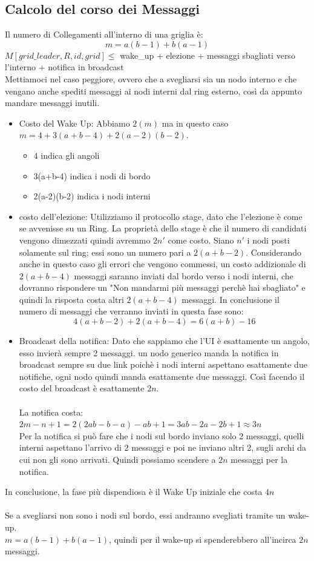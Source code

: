 \subsection{Calcolo del corso dei Messaggi}
Il numero di Collegamenti all'interno di una griglia è:
$$m=a(b-1)+b(a-1)$$
$M[grid\_leader,R,id,grid] \leq $ wake\_up + elezione + messaggi sbagliati verso l'interno + notifica in broadcast\\
Mettiamoci nel caso peggiore, ovvero che a svegliarsi sia un nodo interno e che vengano anche spediti messaggi ai nodi interni dal ring esterno, così da appunto mandare messaggi inutili.
\begin{itemize}
    \item Costo del Wake Up: Abbiamo $2(m)$ ma in questo caso $m = 4+3(a+b-4)+2(a-2)(b-2)$.
    \begin{itemize}
        \item $4$ indica gli angoli
        \item 3(a+b-4) indica i nodi di bordo
        \item 2(a-2)(b-2) indica i nodi interni
    \end{itemize}
    \item costo dell'elezione: Utilizziamo il protocollo stage, dato che l'elezione è come se avvenisse su un Ring. La proprietà dello stage è che il numero di candidati vengono dimezzati quindi avremmo $2n'$ come costo. Siano $n'$ i nodi posti solamente sul ring; essi sono un numero pari a $2(a+b-2)$. Considerando anche in questo caso gli errori che vengono commessi, un costo addizionale di $2(a+b-4)$ messaggi saranno inviati dal bordo verso i nodi interni, che dovranno rispondere un "Non mandarmi più messaggi perchè hai sbagliato" e quindi la risposta costa altri $2(a+b-4)$ messaggi. In conclusione il numero di messaggi che verranno inviati in questa fase sono:
    $$4(a+b-2)+2(a+b-4) = 6(a+b)-16$$
    \item Broadcast della notifica: Dato che sappiamo che l'UI è esattamente un angolo, esso invierà sempre 2 messaggi. un nodo generico manda la notifica in broadcast sempre su due link poichè i nodi interni aspettano esattamente due notifiche, ogni nodo quindi manda esattamente due messaggi. Così facendo il costo del broadcast è esattamente $2n$.\\\\La notifica costa: $2m - n +1 = 2 (2ab -b-a) -ab +1 = 3ab-2a-2b+1 \approx 3n$\\
Per la notifica si può fare che i nodi sul bordo inviano solo 2 messaggi, quelli interni aspettano l'arrivo di 2 messaggi e poi ne inviano altri 2, sugli archi da cui non gli sono arrivati. Quindi possiamo scendere a $2n$ messaggi per la notifica.
\end{itemize}
In conclusione, la fase più dispendiosa è il Wake Up iniziale che costa $4n$\\\\
Se a svegliarsi non sono i nodi sul bordo, essi andranno svegliati tramite un wake-up.\\
$m = a(b-1) + b(a-1)$, quindi per il wake-up si spenderebbero all'incirca $2n$ messaggi.

